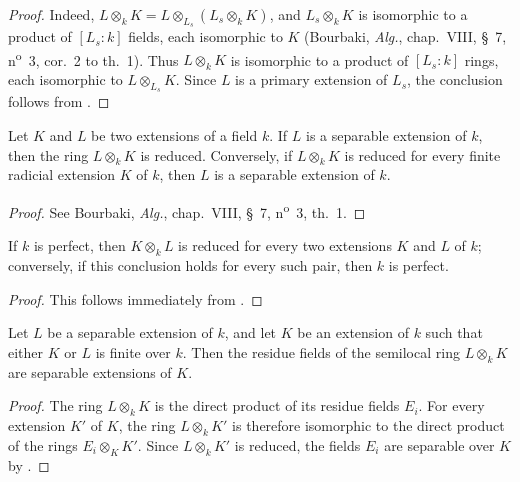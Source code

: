 \begin{proof}
Indeed, $L\otimes_k K
=L\otimes_{L_s}(L_s\otimes_k K)$,
and $L_s\otimes_k K$ is isomorphic to a product of $[L_s:k]$ fields,
each isomorphic to $K$
(Bourbaki, \emph{Alg.}, chap.~VIII, \S~7, n\textsuperscript{o}~3,
cor.~2 to th.~1).
Thus $L\otimes_k K$ is isomorphic to a product of $[L_s:k]$ rings,
each isomorphic to $L\otimes_{L_s}K$.
Since $L$ is a primary extension of $L_s$, the conclusion follows from
.
\end{proof}

\begin{proposition}[4.3.5]
\label{IV.4.3.5}
Let $K$ and $L$ be two extensions of a field $k$.
If $L$ is a separable extension of $k$, then the ring
$L\otimes_k K$ is reduced.
Conversely, if $L\otimes_k K$ is reduced for every finite radicial
extension $K$ of $k$, then $L$ is a separable extension of $k$.
\end{proposition}

\begin{proof}
See Bourbaki, \emph{Alg.}, chap.~VIII, \S~7, n\textsuperscript{o}~3, th.~1.
\end{proof}

\begin{corollary}[4.3.6]
\label{IV.4.3.6}
If $k$ is perfect, then $K\otimes_k L$ is reduced for every two
extensions $K$ and $L$ of $k$; conversely, if this conclusion holds for
every such pair, then $k$ is perfect.
\end{corollary}

\begin{proof}
This follows immediately from .
\end{proof}

\begin{corollary}[4.3.7]
\label{IV.4.3.7}
Let $L$ be a separable extension of $k$, and let $K$ be an extension of
$k$ such that either $K$ or $L$ is finite over $k$.
Then the residue fields of the semilocal ring $L\otimes_k K$ are
separable extensions of $K$.
\end{corollary}

\begin{proof}
The ring $L\otimes_k K$ is the direct product of its residue fields
$E_i$.
For every extension $K'$ of $K$, the ring $L\otimes_k K'$ is therefore
isomorphic to the direct product of the rings $E_i\otimes_K K'$.
Since $L\otimes_k K'$ is reduced, the fields $E_i$ are separable over
$K$ by .
\end{proof}

